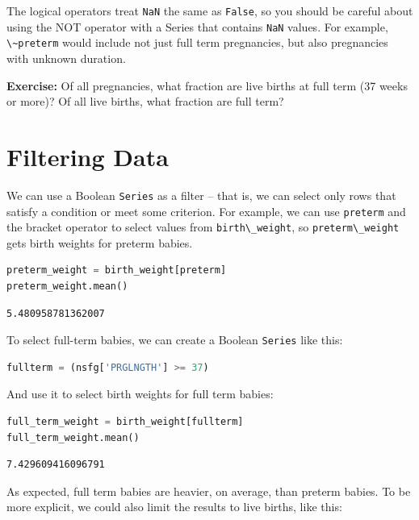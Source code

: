 \documentclass[
]{book}
\newcommand{\passthrough}[1]{#1}
\begin{document}
The logical operators treat \passthrough{\lstinline!NaN!} the same as
\passthrough{\lstinline!False!}, so you should be careful about using
the NOT operator with a Series that contains
\passthrough{\lstinline!NaN!} values. For example,
\passthrough{\lstinline!\~preterm!} would include not just full term
pregnancies, but also pregnancies with unknown duration.

\textbf{Exercise:} Of all pregnancies, what fraction are live births at
full term (37 weeks or more)? Of all live births, what fraction are full
term?

\section{Filtering Data}\label{filtering-data}

We can use a Boolean \passthrough{\lstinline!Series!} as a filter --
that is, we can select only rows that satisfy a condition or meet some
criterion. For example, we can use \passthrough{\lstinline!preterm!} and
the bracket operator to select values from
\passthrough{\lstinline!birth\_weight!}, so
\passthrough{\lstinline!preterm\_weight!} gets birth weights for preterm
babies.

\begin{lstlisting}[language=Python]
preterm_weight = birth_weight[preterm]
preterm_weight.mean()
\end{lstlisting}

\begin{lstlisting}
5.480958781362007
\end{lstlisting}

To select full-term babies, we can create a Boolean
\passthrough{\lstinline!Series!} like this:

\begin{lstlisting}[language=Python]
fullterm = (nsfg['PRGLNGTH'] >= 37)
\end{lstlisting}

And use it to select birth weights for full term babies:

\begin{lstlisting}[language=Python]
full_term_weight = birth_weight[fullterm]
full_term_weight.mean()
\end{lstlisting}

\begin{lstlisting}
7.429609416096791
\end{lstlisting}

As expected, full term babies are heavier, on average, than preterm
babies. To be more explicit, we could also limit the results to live
births, like this:
\end{document}
